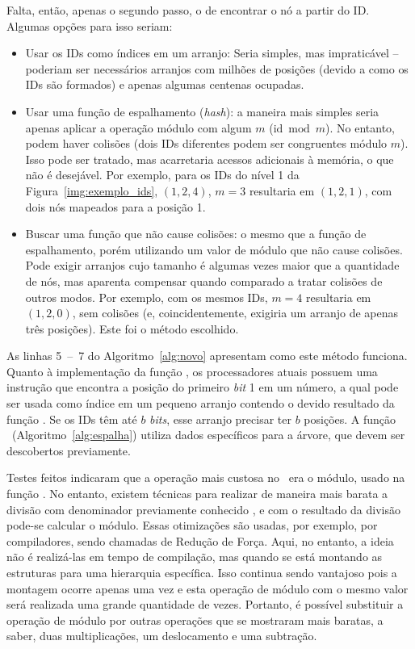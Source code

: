 

Falta, então, apenas o segundo passo, o de encontrar o nó a partir do ID.
Algumas opções para isso seriam:
\begin{itemize}
	\item Usar os IDs como índices em um arranjo: Seria simples, mas impraticável -- poderiam ser necessários arranjos com milhões de posições (devido a como os IDs são formados) e apenas algumas centenas ocupadas.
	\item Usar uma função de espalhamento (\textit{hash}): a maneira mais simples seria apenas aplicar a operação módulo com algum $m$ ($\mathrm{id} \bmod m$).
	No entanto, podem haver colisões (dois IDs diferentes podem ser congruentes módulo $m$).
	Isso pode ser tratado, mas acarretaria acessos adicionais à memória, o que não é desejável.
	Por exemplo, para os IDs do nível 1 da Figura~\ref{img:exemplo_ids}, $(1, 2, 4)$, $m = 3$ resultaria em $(1, 2, 1)$, com dois nós mapeados para a posição 1.
	\item Buscar uma função que não cause colisões: o mesmo que a função de espalhamento, porém utilizando um valor de módulo que não cause colisões.
	Pode exigir arranjos cujo tamanho é algumas vezes maior que a quantidade de nós, mas aparenta compensar quando comparado a tratar colisões de outros modos.
	Por exemplo, com os mesmos IDs, $m = 4$ resultaria em $(1, 2, 0)$, sem colisões (e, coincidentemente, exigiria um arranjo de apenas três posições).
	Este foi o método escolhido.
\end{itemize}

As linhas 5~--~7 do Algoritmo~\ref{alg:novo} apresentam como este método funciona.
Quanto à implementação da função \bpn, os processadores atuais possuem uma instrução que encontra a posição do primeiro \textit{bit} 1 em um número, a qual pode ser usada como índice em um pequeno arranjo contendo o devido resultado da função \bpn.
Se os IDs têm até $b$ \textit{bits}, esse arranjo precisar ter $b$ posições.
A função \Espalha\ (Algoritmo~\ref{alg:espalha}) utiliza dados específicos para a árvore, que devem ser descobertos previamente.

Testes feitos indicaram que a operação mais custosa no \Novo\ era o módulo, usado na função \Espalha.
No entanto, existem técnicas para realizar de maneira mais barata a divisão com denominador previamente conhecido \cite{reciproco}, e com o resultado da divisão pode-se calcular o módulo.
Essas otimizações são usadas, por exemplo, por compiladores, sendo chamadas de Redução de Força.
Aqui, no entanto, a ideia não é realizá-las em tempo de compilação, mas quando se está montando as estruturas para uma hierarquia específica.
Isso continua sendo vantajoso pois a montagem ocorre apenas uma vez e esta operação de módulo com o mesmo valor será realizada uma grande quantidade de vezes.
Portanto, é possível substituir a operação de módulo por outras operações que se mostraram mais baratas, a saber, duas multiplicações, um deslocamento e uma subtração.

